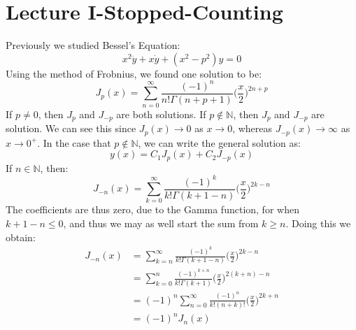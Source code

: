     \section{Lecture I-Stopped-Counting}
        Previously we studied Bessel's Equation:
        \begin{equation}
            x^{2}\ddot{y}+x\dot{y}+(x^{2}-p^{2})y=0
        \end{equation}
        Using the method of Frobnius, we found one solution to be:
        \begin{equation}
            J_{p}(x)=\sum_{n=0}^{\infty}
                \frac{(\minus{1})^{n}}{n!\Gamma(n+p+1)}
                \Big(\frac{x}{2}\Big)^{2n+p}
        \end{equation}
        If $p\ne{0}$, then $J_{p}$ and $J_{\minus{p}}$ are both
        solutions. If $p\notin\mathbb{N}$, then $J_{p}$ and
        $J_{\minus{p}}$ are solution. We can see this since
        $J_{p}(x)\rightarrow{0}$ as $x\rightarrow{0}$, whereas
        $J_{\minus{p}}(x)\rightarrow\infty$ as
        $x\rightarrow{0}^{+}$. In the case that $p\notin\mathbb{N}$,
        we can write the general solution as:
        \begin{equation}
            y(x)=C_{1}J_{p}(x)+C_{2}J_{\minus{p}}(x)
        \end{equation}
        If $n\in\mathbb{N}$, then:
        \begin{equation}
            J_{\minus{n}}(x)=\sum_{k=0}^{\infty}
                \frac{(\minus{1})^{k}}{k!\Gamma(k+1-n)}
                \Big(\frac{x}{2}\Big)^{2k-n}
        \end{equation}
        The coefficients are thus zero, due to the Gamma function,
        for when $k+1-n\leq{0}$, and thus we may as well start
        the sum from $k\geq{n}$. Doing this we obtain:
        \begin{subequations}
            \begin{align}
                J_{\minus{n}}(x)&=\sum_{k=n}^{\infty}
                    \frac{(\minus{1})^{k}}{k!\Gamma(k+1-n)}
                    \Big(\frac{x}{2}\Big)^{2k-n}\\
                &=\sum_{k=0}^{n}
                    \frac{(\minus{1})^{k+n}}{k!\Gamma(k+1)}
                    \Big(\frac{x}{2}\Big)^{2(k+n)-n}\\
                &=(\minus{1})^{n}\sum_{n=0}^{\infty}
                    \frac{(\minus{1})^{n}}{k!(n+k)!}
                    \Big(\frac{x}{2}\Big)^{2k+n}\\
                &=(\minus{1})^{n}J_{n}(x)
            \end{align}
        \end{subequations}
